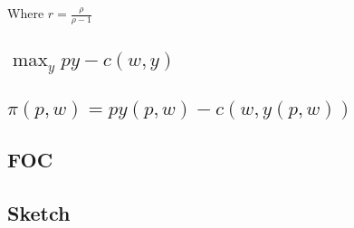 \documentclass{article}
\begin{document}
Where $r = \frac{\rho}{\rho -1}$
\subsection{$\max_y py - c(w, y)$ }


\subsection{$\pi (p,w) = py(p,w) - c(w, y(p,w))$}


\subsection{FOC}


\subsection{Sketch}
\end{document}
